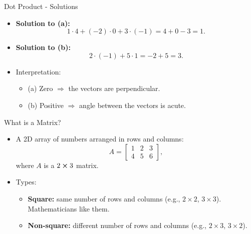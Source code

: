 \documentclass{beamer}
\begin{document}
\begin{frame}{Dot Product - Solutions}
  \begin{itemize}
    \item \textbf{Solution to (a):}
    \[
    1 \cdot 4 + (-2) \cdot 0 + 3 \cdot (-1) = 4 + 0 - 3 = \boxed{1}.
    \]
    \item \textbf{Solution to (b):}
    \[
    2 \cdot (-1) + 5 \cdot 1 = -2 + 5 = \boxed{3}.
    \]
    \item Interpretation:
    \begin{itemize}
      \item (a) Zero \(\Rightarrow\) the vectors are perpendicular.
      \item (b) Positive \(\Rightarrow\) angle between the vectors is acute.
    \end{itemize}
  \end{itemize}
\end{frame}

\begin{frame}{What is a Matrix?}
  \begin{itemize}
    \item A 2D array of numbers arranged in rows and columns:
    \begin{equation}
    A = \begin{bmatrix} 1 & 2 & 3 \\ 4 & 5 & 6 \end{bmatrix},
    \end{equation}
    where \(A\) is a \(2\cross3\) matrix.
    \item Types:
    \begin{itemize}
      \item \textbf{Square:} same number of rows and columns (e.g., $2\times2$, $3\times3$). Mathematicians like them.
      \item \textbf{Non-square:} different number of rows and columns (e.g., $2\times3$, $3\times2$).
    \end{itemize}
  \end{itemize}
\end{frame}
\end{document}
